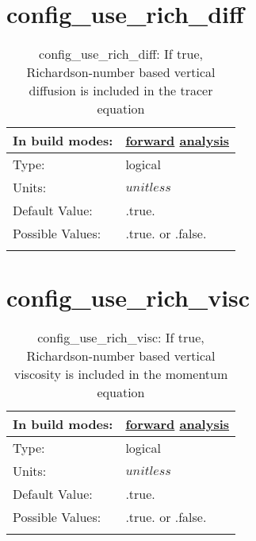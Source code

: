 \section[config\_use\_rich\_diff]{config\_use\_rich\_diff}
\label{sec:nm_sec_config_use_rich_diff}
\begin{center}
\begin{longtable}{| p{2.0in} || p{4.0in} |}
    \hline
    In build modes: & \hyperref[subsec:forward_nm_tab_vmix_rich]{forward} \hyperref[subsec:analysis_nm_tab_vmix_rich]{analysis} \\
    \hline
    Type: & logical \\
    \hline
    Units: & $unitless$ \\
    \hline
    Default Value: & .true. \\
    \hline
    Possible Values: & .true. or .false. \\
    \hline
    \caption{config\_use\_rich\_diff: If true, Richardson-number based vertical diffusion is included in the tracer equation}
\end{longtable}
\end{center}
\section[config\_use\_rich\_visc]{config\_use\_rich\_visc}
\label{sec:nm_sec_config_use_rich_visc}
\begin{center}
\begin{longtable}{| p{2.0in} || p{4.0in} |}
    \hline
    In build modes: & \hyperref[subsec:forward_nm_tab_vmix_rich]{forward} \hyperref[subsec:analysis_nm_tab_vmix_rich]{analysis} \\
    \hline
    Type: & logical \\
    \hline
    Units: & $unitless$ \\
    \hline
    Default Value: & .true. \\
    \hline
    Possible Values: & .true. or .false. \\
    \hline
    \caption{config\_use\_rich\_visc: If true, Richardson-number based vertical viscosity is included in the momentum equation}
\end{longtable}
\end{center}
